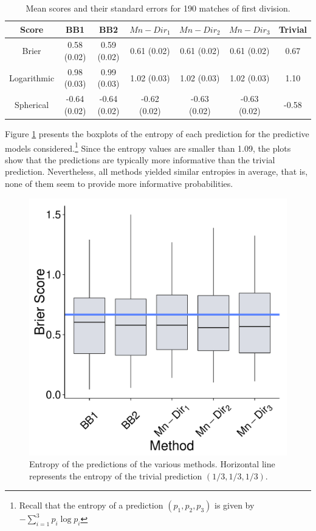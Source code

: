 \documentclass[journal,article,accept,moreauthors,pdftex,12pt,a4paper]{mdpi}
\begin{document}
\begin{table}[H]
\begin{center}
\begin{tabular}{ccccccc}
\hline
Score & BB1 & BB2 & $Mn-Dir_1$ & $Mn-Dir_2$ & $Mn-Dir_3$ & Trivial \\
\hline
\hline
Brier &0.58 (0.02) & 0.59 (0.02)& 0.61 (0.02)& 0.61 (0.02) & 0.61  (0.02) & 0.67 \\
Logarithmic & 0.98 (0.03) & 0.99 (0.03) & 1.02 (0.03)  & 1.02 (0.03)  & 1.02 (0.03) & 1.10  \\
Spherical &  -0.64 (0.02)& -0.64 (0.02)& -0.62 (0.02)& -0.63 (0.02)& -0.63 (0.02)& -0.58\\
\hline
\end{tabular}
\caption{Mean scores and their standard errors for 190 matches of first division.}
\label{tab::brier}
\end{center}
\end{table}


Figure \ref{fig::entropy} presents the boxplots of the entropy of each prediction for the predictive models considered.\footnote{Recall
that the entropy of a prediction $(p_1,p_2,p_3)$ is given by $- \sum_{i=1}^3 p_i \log{p_i}$}
Since the entropy values are smaller than 1.09, the plots show that the predictions
are typically more informative than the trivial prediction. Nevertheless, all methods yielded similar entropies in average, that is,
none of them seem to provide more informative probabilities.



\begin{figure}[H]
  \centering
\includegraphics[page=10,scale=0.3]{futebolComparacaoModelosForPaper.pdf}
  \caption{Entropy of the predictions of the various methods. Horizontal line represents the entropy of the trivial prediction $(1/3,1/3,1/3)$.}
  \label{fig::entropy}
\end{figure}
\end{document}
